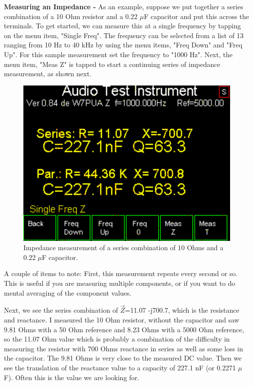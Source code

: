 \textbf{Measuring an Impedance - }As an example, suppose we put together a series combination of a 10 Ohm resistor and a 0.22 $\mu$F capacitor and put this across the  terminals. To get started, we can measure this at a single frequency by tapping on the menu item, "\textsf{Single Freq}". The frequency can be selected from a list of 13 ranging from 10 Hz to 40 kHz by using the menu items, "\textsf{Freq Down}" and "\textsf{Freq Up}".  For this sample measurement set the frequency to "1000 Hz".  Next, the menu item, "\textsf{Meas Z}" is tapped to start a continuing series of impedance measurement, as shown next.
\begin{figure}[H]
\begin{center}
\includegraphics[scale=0.75]{./images/AVNA_006.pdf}
\caption{Impedance measurement of a series combination of 10 Ohms and a 0.22 $\mu$F capacitor.}
\label{AVNA_006-label}
\end{center}
\end{figure}
A couple of items to note:  First, this measurement repeats every second or so.
This is useful if you are measuring multiple components, or if you want to do mental averaging of the component values.

Next, we see the series combination of  $\vec{Z}$=11.07 -j700.7, which is the resistance and reactance. I measured the 10 Ohm resistor, without the capacitor and saw 9.81 Ohms with a 50 Ohm reference and 8.23 Ohms with a 5000 Ohm reference, so the 11.07 Ohm value which is probably a combination of the difficulty in measuring the resistor with 700 Ohms reactance in series as well as some loss in the capacitor.  The 9.81 Ohms is very close to the measured DC value. Then we see the translation of the reactance value to a capacity of 227.1 nF (or 0.2271 $\mu$F).  Often this is the value we are looking for.

